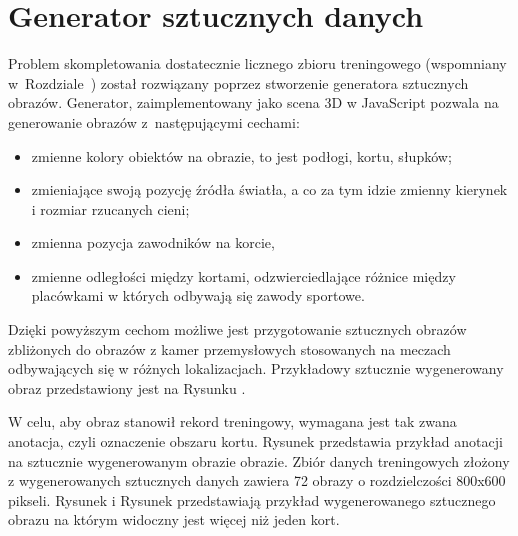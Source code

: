 \newpage
\section{Generator sztucznych danych}
\label{sec:generator}

Problem skompletowania dostatecznie licznego zbioru treningowego (wspomniany w~Rozdziale~) został rozwiązany poprzez stworzenie generatora sztucznych obrazów.
Generator, zaimplementowany jako scena 3D w JavaScript pozwala na generowanie obrazów z~następującymi cechami:

\begin{itemize}
	\item zmienne kolory obiektów na obrazie, to jest podłogi, kortu, słupków;
	\item zmieniające swoją pozycję źródła światła, a co za tym idzie zmienny kierynek i rozmiar rzucanych cieni;
	\item zmienna pozycja zawodników na korcie, 
	\item zmienne odległości między kortami, odzwierciedlające różnice między placówkami w których odbywają się zawody sportowe.
\end{itemize}

Dzięki powyższym cechom możliwe jest przygotowanie sztucznych obrazów zbliżonych do obrazów z kamer przemysłowych stosowanych na meczach odbywających się w różnych lokalizacjach. Przykładowy sztucznie wygenerowany obraz przedstawiony jest na Rysunku .

W celu, aby obraz stanowił rekord treningowy, wymagana jest tak zwana anotacja, czyli oznaczenie obszaru kortu. Rysunek  przedstawia przykład anotacji na sztucznie wygenerowanym obrazie obrazie.
Zbiór danych treningowych złożony z wygenerowanych sztucznych danych zawiera 72 obrazy o rozdzielczości 800x600 pikseli. Rysunek  i Rysunek  przedstawiają przykład wygenerowanego sztucznego obrazu na którym widoczny jest więcej niż jeden kort.

